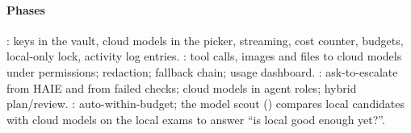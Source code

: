 \paragraph{Phases} : keys in the vault, cloud models in the picker, streaming, cost counter, budgets, local-only lock, activity log entries. : tool calls, images and files to cloud models under permissions; redaction; fallback chain; usage dashboard. : ask-to-escalate from HAIE and from failed checks; cloud models in agent roles; hybrid plan/review. : auto-within-budget; the model scout () compares local candidates with cloud models on the local exams to answer ``is local good enough yet?''.
